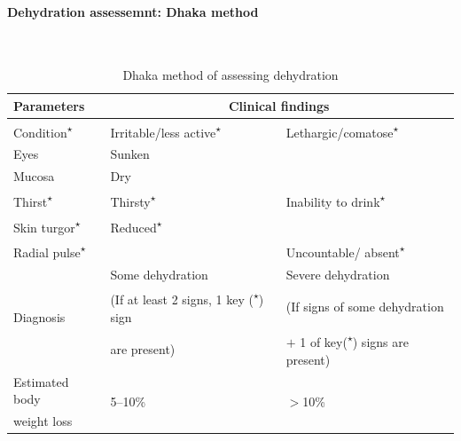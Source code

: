 \documentclass[11pt,a4paper]{report}
\begin{document}
\paragraph{Dehydration assessemnt: Dhaka method}
\begin{table}[ht]
	\centering
	\caption[Dhaka method dehydration assessment]{Dhaka method of assessing dehydration \cite{chisti2010influences}} ~\\
	\begin{tabular}{l|l|l} 
		\toprule[1.5pt]
		Parameters & \multicolumn{2}{c}{Clinical findings} \\
		\midrule
		Condition\textsuperscript{$\star$}	& Irritable/less active\textsuperscript{$\star$} & Lethargic/comatose\textsuperscript{$\star$} \\
		Eyes & Sunken &  \\
		Mucosa & Dry & \\
		Thirst\textsuperscript{$\star$} & Thirsty\textsuperscript{$\star$} & Inability to drink\textsuperscript{$\star$} \\
		Skin turgor\textsuperscript{$\star$} & Reduced\textsuperscript{$\star$} & \\
		Radial pulse\textsuperscript{$\star$} & & Uncountable/ absent\textsuperscript{$\star$} \\
		
		\midrule
		\multirow{3}{*}{Diagnosis} & Some dehydration & Severe dehydration \\
		& (If at least 2 signs, 1 key (\textsuperscript{$\star$}) sign & (If signs of some dehydration \\
		& are present) & $+$ 1 of key(\textsuperscript{$\star$}) signs are present) \\
		
		\midrule
		Estimated body & \multirow{2}{*}{5--10\%} & \multirow{2}{*}{$>$10\%} \\
		weight loss & & \\
		\bottomrule[1.5pt]
	\end{tabular}
	\begin{flushleft} 
	\end{flushleft}
	\label{dhaka-dehydration}
\end{table}	
\end{document}
